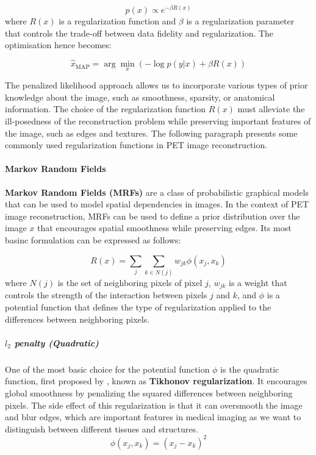 \begin{equation}
    p(x) \propto e^{-\beta R(x)}
\end{equation}
where $R(x)$ is a regularization function and $\beta$ is a regularization parameter that controls the trade-off between data fidelity and regularization. The optimisation hence becomes:

\begin{equation}
    \hat{x}_{\text{MAP}} = \arg \min_{x} \left( -\log p(y|x) + \beta R(x) \right)
\end{equation}

The penalized likelihood approach allows us to incorporate various types of prior knowledge about the image, such as smoothness, sparsity, or anatomical information.
The choice of the regularization function $R(x)$ must alleviate the ill-posedness of the reconstruction problem while preserving important features of the image, such as edges and textures.
The following paragraph presents some commonly used regularization functions in PET image reconstruction.

\paragraph{Markov Random Fields}

\textbf{Markov Random Fields (MRFs)} are a class of probabilistic graphical models that can be used to model spatial dependencies in images. In the context of PET image reconstruction, MRFs can be used to define a prior distribution over the image $x$ that encourages spatial smoothness while preserving edges.
Its most basinc formulation can be expressed as follows:

\begin{equation}
    R(x) = \sum_{j} \sum_{k \in N(j)} w_{jk} \phi(x_j, x_k)
    \label{eq:mrf}
\end{equation}
where $N(j)$ is the set of neighboring pixels of pixel $j$, $w_{jk}$ is a weight that controls the strength of the interaction between pixels $j$ and $k$, and $\phi$ is a potential function that defines the type of regularization applied to the differences between neighboring pixels.

\subparagraph{$l_2$ penalty (Quadratic)}

One of the most basic choice for the potential function $\phi$ is the quadratic function, first proposed by \cite{tikhonov1977solutions}, known as \textbf{Tikhonov regularization}. It encourages global smoothness by penalizing the squared differences between neighboring pixels. The side effect of this regularization is that it can oversmooth the image and blur edges, which are important features in medical imaging as we want to distinguish between different tissues and structures.
\begin{equation}
    \phi(x_j, x_k) = (x_j - x_k)^2
\end{equation}

